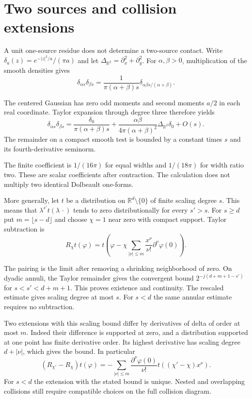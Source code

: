 \section{Two sources and collision extensions}

A unit one-source residue does not determine a two-source
contact. Write $\delta_a(z)=e^{-|z|^2/a}/(\pi a)$ and let
$\Delta_{\mathbb R^2}=\partial_x^2+\partial_y^2$.
For $\alpha,\beta>0$, multiplication of the smooth densities gives
\[
 \delta_{\alpha s}\delta_{\beta s}
 =\frac1{\pi(\alpha+\beta)s}
             \delta_{\alpha\beta s/(\alpha+\beta)}.
\]

The centered Gaussian has zero odd moments and second
moments $a/2$ in each real coordinate. Taylor expansion
through degree three therefore yields
\begin{equation}\label{mht:eq:two-source-width-contact}
 \delta_{\alpha s}\delta_{\beta s}
 =\frac{\delta_0}{\pi(\alpha+\beta)s}
 +\frac{\alpha\beta}{4\pi(\alpha+\beta)^2}
                         \Delta_{\mathbb R^2}\delta_0+O(s).
\end{equation}
The remainder on a compact smooth test is bounded by a
constant times $s$ and its fourth-derivative seminorm.

The finite coefficient is $1/(16\pi)$ for equal widths
and $1/(18\pi)$ for width ratio two. These are scalar
coefficients after contraction. The calculation does not
multiply two identical Dolbeault one-forms.

More generally, let $t$ be a distribution on
$\mathbb R^d\setminus\{0\}$ of finite scaling degree $s$.
This means that $\lambda^{s'}t(\lambda\,\cdot)$ tends to
zero distributionally for every $s'>s$.
For $s\geq d$ put $m=\lfloor s-d\rfloor$ and choose
$\chi=1$ near zero with compact support. Taylor subtraction is
\begin{equation}\label{mht:eq:collision-taylor-subtraction}
 R_\chi t(\varphi)=t\left(\varphi-\chi
       \sum_{|\nu|\leq m}\frac{x^\nu}{\nu!}
                                  \partial^\nu\varphi(0)\right).
\end{equation}

The pairing is the limit after removing a shrinking
neighborhood of zero. On dyadic annuli, the Taylor remainder
gives the convergent bound $2^{-j(d+m+1-s')}$ for
$s<s'<d+m+1$. This proves existence and continuity.
The rescaled estimate gives scaling degree at most $s$.
For $s<d$ the same annular estimate requires no subtraction.

Two extensions with this scaling bound differ by
derivatives of delta of order at most $m$.
Indeed their difference is supported at zero, and a
distribution supported at one point has finite derivative
order. Its highest derivative has scaling degree
$d+|\nu|$, which gives the bound. In particular
\[
 (R_{\chi'}-R_\chi)t(\varphi)
 =-\sum_{|\nu|\leq m}\frac{\partial^\nu\varphi(0)}{\nu!}
                          t((\chi'-\chi)x^\nu).
\]
For $s<d$ the extension with the stated bound is unique.
Nested and overlapping collisions still require compatible
choices on the full collision diagram.

